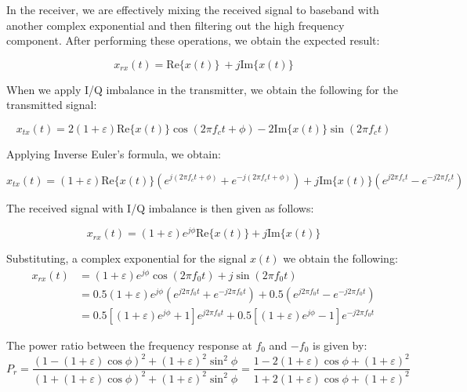\documentclass{article}
\begin{document}
In the receiver, we are effectively mixing the received signal to baseband with another complex exponential and then filtering out the high frequency component. After performing these operations, we obtain the expected result:
 
\begin{equation}
	x_{rx}(t) = \text{Re}\{x(t)\}\ + j\text{Im}\{x(t)\}
\end{equation}

When we apply I/Q imbalance in the transmitter, we obtain the following for the transmitted signal:

\begin{equation}
	x_{tx}(t) = 2(1+\varepsilon)\text{Re}\{x(t)\}\cos(2{\pi}f_ct + \phi) - 2\text{Im}\{x(t)\}\sin(2{\pi}f_ct)
\end{equation}

Applying Inverse Euler's formula, we obtain:

\begin{equation}
	x_{tx}(t) = (1+\varepsilon)\text{Re}\{x(t)\}(e^{j(2{\pi}f_ct+\phi)} + e^{-j(2{\pi}f_ct+\phi)}) + j\text{Im}\{x(t)\}(e^{j2{\pi}f_ct} - e^{-j2{\pi}f_ct})
\end{equation}

The received signal with I/Q imbalance is then given as follows:

\begin{equation}
	x_{rx}(t) = (1+\varepsilon)e^{j\phi}\text{Re}\{x(t)\} + j\text{Im}\{x(t)\}
\end{equation}

Substituting, a complex exponential for the signal $x(t)$ we obtain the following:
\begin{align}
	x_{rx}(t) &= (1+\varepsilon)e^{j\phi}\cos(2{\pi}f_0t) + j\sin(2{\pi}f_0t) \\
	&= 0.5(1+\varepsilon)e^{j\phi}(e^{j2{\pi}f_0t} + e^{-j2{\pi}f_0t}) + 0.5(e^{j2{\pi}f_0t} - e^{-j2{\pi}f_0t})\\
	&= 0.5[(1+\varepsilon)e^{j\phi} + 1]e^{j2{\pi}f_0t} + 0.5[(1+\varepsilon)e^{j\phi} - 1]e^{-j2{\pi}f_0t} \label{eq::rx_signal_iq_imbalance}
\end{align}

The power ratio between the frequency response at $f_0$ and $-f_0$ is given by: 
\begin{equation}
	P_r = \frac{(1-(1+\varepsilon)\cos\phi)^2 + (1+\varepsilon)^2\sin^2\phi}{(1+(1+\varepsilon)\cos\phi)^2 + (1+\varepsilon)^2\sin^2\phi} = \frac{1-2(1+\varepsilon)\cos\phi+(1+\varepsilon)^2}{1+2(1+\varepsilon)\cos\phi+(1+\varepsilon)^2}
\end{equation}
\end{document}
